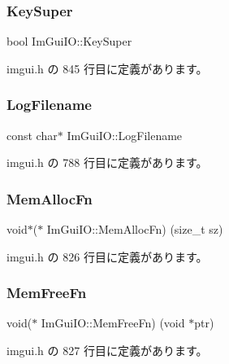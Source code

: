 \subsubsection{\texorpdfstring{Key\+Super}{KeySuper}}
{\footnotesize\ttfamily bool Im\+Gui\+I\+O\+::\+Key\+Super}



 imgui.\+h の 845 行目に定義があります。

\mbox{\label{struct_im_gui_i_o_ae77a1beed11820366800645232a6ad1c}} 
\subsubsection{\texorpdfstring{Log\+Filename}{LogFilename}}
{\footnotesize\ttfamily const char$\ast$ Im\+Gui\+I\+O\+::\+Log\+Filename}



 imgui.\+h の 788 行目に定義があります。

\mbox{\label{struct_im_gui_i_o_a352f6f0770974ee173f84d99d9e50a6e}} 
\subsubsection{\texorpdfstring{Mem\+Alloc\+Fn}{MemAllocFn}}
{\footnotesize\ttfamily void$\ast$($\ast$ Im\+Gui\+I\+O\+::\+Mem\+Alloc\+Fn) (size\+\_\+t sz)}



 imgui.\+h の 826 行目に定義があります。

\mbox{\label{struct_im_gui_i_o_adb56df4e96ab8a9f1aefe8dd474ba0f5}} 
\subsubsection{\texorpdfstring{Mem\+Free\+Fn}{MemFreeFn}}
{\footnotesize\ttfamily void($\ast$ Im\+Gui\+I\+O\+::\+Mem\+Free\+Fn) (void $\ast$ptr)}



 imgui.\+h の 827 行目に定義があります。

